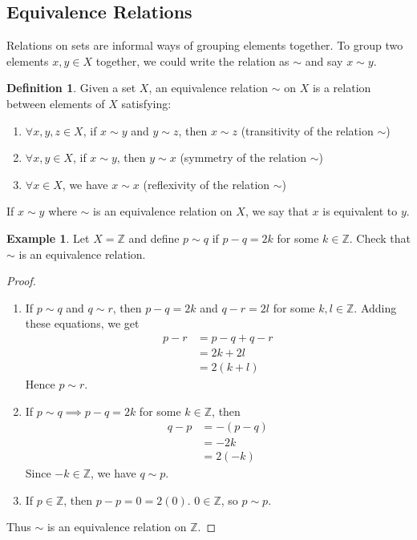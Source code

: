 \documentclass[12pt,letterpaper,DIV=11,final]{scrartcl}
\theoremstyle{plain}
\theoremstyle{definition}
\newtheorem{definition}{Definition}[section]
\newtheorem{example}{Example}[section]
\theoremstyle{remark}
\begin{document}
\subsection{Equivalence Relations}
Relations on sets are informal ways of grouping elements together.
To group two elements $x, y \in X$ together, we could write the relation as $\sim$ and say $x \sim y$.

\begin{definition}
  Given a set $X$, an equivalence relation $\sim$ on $X$ is a relation between elements of $X$ satisfying:
  \begin{enumerate}
    \item $\forall x, y, z \in X$, if $x \sim y$ and $y \sim z$, then $x \sim z$ (transitivity of the relation $\sim$)
    \item $\forall x, y \in X$, if $x \sim y$, then $y \sim x$ (symmetry of the relation $\sim$)
    \item $\forall x \in X$, we have $x \sim x$ (reflexivity of the relation $\sim$)
  \end{enumerate}
  If $x \sim y$ where $\sim$ is an equivalence relation on $X$, we say that $x$ is equivalent to $y$.
\end{definition}

\begin{example}\label{ex:equiv2k}
  Let $X = \mathbb{Z}$ and define $p \sim q$ if $p - q = 2k$ for some $k \in \mathbb{Z}$.
  Check that $\sim$ is an equivalence relation.

  \begin{proof}\leavevmode
    \begin{enumerate}
      \item If $p \sim q$ and $q \sim r$, then $p - q = 2k$ and $q - r = 2l$ for some $k, l \in \mathbb{Z}$.
        Adding these equations, we get
        \begin{align*}
          p - r &= p - q + q - r \\
                &= 2k + 2l \\
                &= 2 (k + l)
        \end{align*}
        Hence $p \sim r$.

      \item If $p \sim q \implies p - q = 2k$ for some $k \in \mathbb{Z}$, then
        \begin{align*}
          q - p &= -(p - q) \\
                &= -2k \\
                &= 2(-k)
        \end{align*}
        Since $-k \in \mathbb{Z}$, we have $q \sim p$.

      \item If $p \in \mathbb{Z}$, then $p - p = 0 = 2 (0)$. $0 \in \mathbb{Z}$, so $p \sim p$.
    \end{enumerate}
    Thus $\sim$ is an equivalence relation on $\mathbb{Z}$.
  \end{proof}
\end{example}
\end{document}

